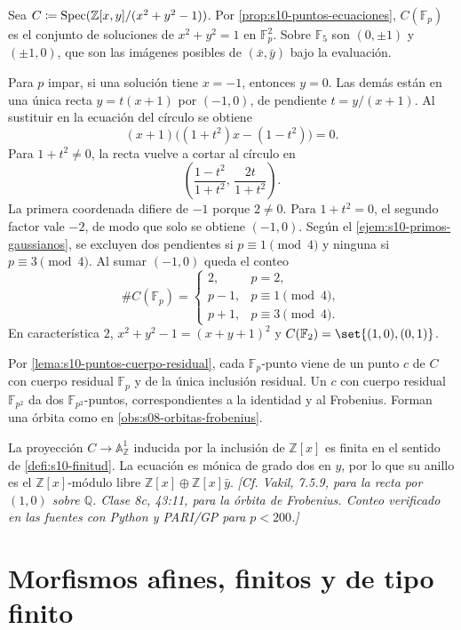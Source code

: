 \begin{obs}
\label{obs:s10-circulo-fp}
Sea \(C\coloneqq\operatorname{Spec}(\mathbb Z[x,y]/(x^2+y^2-1))\). Por \cref{prop:s10-puntos-ecuaciones}, \(C(\mathbb F_p)\) es el conjunto de soluciones de \(x^2+y^2=1\) en \(\mathbb F_p^2\). Sobre \(\mathbb F_5\) son \((0,\pm1)\) y \((\pm1,0)\), que son las imágenes posibles de \((\bar x,\bar y)\) bajo la evaluación.

Para \(p\) impar, si una solución tiene \(x=-1\), entonces \(y=0\). Las demás están en una única recta \(y=t(x+1)\) por \((-1,0)\), de pendiente \(t=y/(x+1)\). Al sustituir en la ecuación del círculo se obtiene
\[
 (x+1)\bigl((1+t^2)x-(1-t^2)\bigr)=0.
\]
Para \(1+t^2\ne0\), la recta vuelve a cortar al círculo en
\[
 \left(\frac{1-t^2}{1+t^2},\,\frac{2t}{1+t^2}\right).
\]
La primera coordenada difiere de \(-1\) porque \(2\ne0\). Para \(1+t^2=0\), el segundo factor vale \(-2\), de modo que solo se obtiene \((-1,0)\). Según el \cref{ejem:s10-primos-gaussianos}, se excluyen dos pendientes si \(p\equiv1\pmod4\) y ninguna si \(p\equiv3\pmod4\). Al sumar \((-1,0)\) queda el conteo
\[
 \#C(\mathbb F_p)=
 \begin{cases}
  2,&p=2,\\
  p-1,&p\equiv1\pmod4,\\
  p+1,&p\equiv3\pmod4.
 \end{cases}
\]
En característica \(2\), \(x^2+y^2-1=(x+y+1)^2\) y \(C(\mathbb F_2)=\set{(1,0),(0,1)}\).

Por \cref{lema:s10-puntos-cuerpo-residual}, cada \(\mathbb F_p\)-punto viene de un punto \(c\) de \(C\) con cuerpo residual \(\mathbb F_p\) y de la única inclusión residual. Un \(c\) con cuerpo residual \(\mathbb F_{p^2}\) da dos \(\mathbb F_{p^2}\)-puntos, correspondientes a la identidad y al Frobenius. Forman una órbita como en \cref{obs:s08-orbitas-frobenius}.

La proyección \(C\to\mathbb A^1_{\mathbb Z}\) inducida por la inclusión de \(\mathbb Z[x]\) es finita en el sentido de \cref{defi:s10-finitud}. La ecuación es mónica de grado dos en \(y\), por lo que su anillo es el \(\mathbb Z[x]\)-módulo libre \(\mathbb Z[x]\oplus\mathbb Z[x]\bar y\). \emph{[Cf. Vakil, 7.5.9, para la recta por \((1,0)\) sobre \(\mathbb Q\). Clase 8c, 43:11, para la órbita de Frobenius. Conteo verificado en las fuentes con Python y PARI/GP para \(p<200\).]}
\end{obs}

\section{Morfismos afines, finitos y de tipo finito}
\label{sec:s10-finitud}

